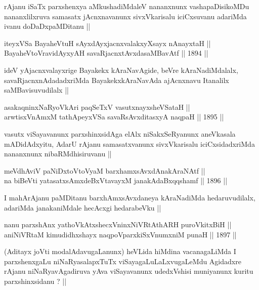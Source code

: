 \begin{artha}
rAjanu iSaTx parxshenxya aMkushadiMdaleV nananxnunx vashapaDisikoMDu
nananxlilxruva samasatx jAcnxnavanunx sivxVkarisalu iciCxsuvanu
adariMda ivanu doDaDxpaMDitanu ||
\end{artha}

\begin{shl}
iteyxVSa BayaheVtuH sAyxdAyxjacnxvalakxyXsayx nAnayxtaH || \\
BayaheVtoVravidAyxyAH savaRjacnxtAvxdasaMBavAtf ||  1894 ||  
\end{shl}

\begin{artha}
ideV yAjacnxvalayxrige Bayakekx kAraNavAgide, beVre kAraNadiMdalalx,
savaRjacnxnAdadadxriMda BayakekxkAraNavAda ajAcnxnavu Itanalilx
saMBavisuvudilalx ||
\end{artha}

\begin{shl}
asakaqninxNaRyoV\s kAri paqSeTxV vasutxnayxsheVSataH || \\
arwtisxVnAmxM tathA\s peyxVSa savaRsAvxditasxyA naqpaH ||  1895 ||  
\end{shl}

\begin{artha}
vasutx viSayavanunx parxshinxsidAga elAlx niSakxSeRyanunx aneVkasala
mADidAdxyitu, AdarU rAjanu samasatxvanunx sivxVkarisalu
iciCxsidadxriMda nananxnunx nibaRMdhisiruvanu ||
\end{artha}

\begin{shl}
meVdhAviV paNiDxtoV\s toV\s yaM barxhamxsAvxdAnakAraNAtf || \\
na biBeVti yatasatxsAmxdeBxVtavayxM janakAdaBxqqshamf ||  1896 ||  
\end{shl}

\begin{artha}
I mahArAjanu paMDitanu barxhAmxsAvxdaneya kAraNadiMda hedaruvudilalx,
adariMda janakaniMdale hecAcxgi hedarabeVku ||
\end{artha}


\begin{shl}
nanu parxshAnx yathoVkAtxshecxVninxNiVRtAthARH puroVkitxBiH || \\
aniNiVRtaM kimudidhxshayx naqpoV\s parxkiSxVnumxniM punaH ||  1897 ||  
\end{shl} 

\begin{artha}
(Aditayx joVti modalAdavugaLanunx) heVLida hiMdina vacanagaLiMda I
  parxshenxgaLu niNaRyasalapxTuTx viSayagaLuLaLxvugaLeMdu Agidadxre
  rAjanu niNaRyavAgadiruva yAva viSayavanunx udedxVshisi muniyanunx
  kuritu parxshinxsidanu ? ||
\end{artha}

